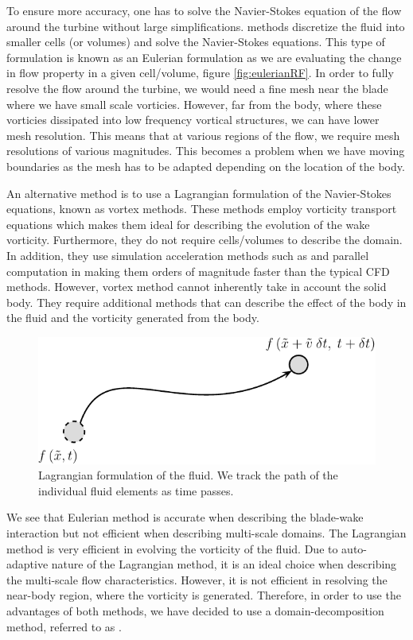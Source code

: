 To ensure more accuracy, one has to solve the Navier-Stokes equation of the flow around the turbine without large simplifications.  methods discretize the fluid into smaller cells (or volumes) and solve the Navier-Stokes equations. This type of formulation is known as an Eulerian formulation as we are evaluating the change in flow property in a given cell/volume, figure \ref{fig:eulerianRF}. In order to fully resolve the flow around the turbine, we would need a fine mesh near the blade where we have small scale vorticies. However, far from the body, where these vorticies dissipated into low frequency vortical structures, we can have lower mesh resolution. This means that at various regions of the flow, we require mesh resolutions of various magnitudes. This becomes a problem when we have moving boundaries as the mesh has to be adapted depending on the location of the body.

An alternative method is to use a Lagrangian formulation of the Navier-Stokes equations, known as vortex methods. These methods employ vorticity transport equations which makes them ideal for describing the evolution of the wake vorticity. Furthermore, they do not require cells/volumes to describe the domain. In addition, they use simulation acceleration methods such as  and parallel computation in  making them orders of magnitude faster than the typical CFD methods. However, vortex method cannot inherently take in account the solid body. They require additional methods that can describe the effect of the body in the fluid and the vorticity generated from the body.

	\begin{figure}[!t]
		\centering
		\includegraphics[width=0.6\linewidth]{figures/introduction/lagrangianRF2-crop.pdf}
		\caption{Lagrangian formulation of the fluid. We track the path of the individual fluid elements as time passes.}
		\label{fig:lagrangianRF}
	\end{figure}

We see that Eulerian method is accurate when describing the blade-wake interaction but not efficient when describing multi-scale domains. The Lagrangian method is very efficient in evolving the vorticity of the fluid. Due to auto-adaptive nature of the Lagrangian method, it is an ideal choice when describing the multi-scale flow characteristics. However, it is not efficient in resolving the near-body region, where the vorticity is generated. Therefore, in order to use the advantages of both methods, we have decided to use a domain-decomposition method, referred to as . 

